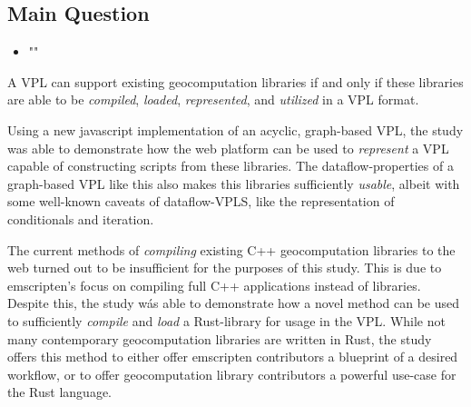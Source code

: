 \subsection*{Main Question}

\begin{itemize}[ ]
    \item "\myMainRQ"
\end{itemize}


A VPL can support existing geocomputation libraries if and only if these libraries are able to be \emph{compiled}, \emph{loaded}, \emph{represented}, and \emph{utilized} in a VPL format.

Using a new javascript implementation of an acyclic, graph-based VPL, the study was able to demonstrate how the web platform can be used to \emph{represent} a VPL capable of constructing scripts from these libraries.
The dataflow-properties of a graph-based VPL like this also makes this libraries sufficiently \emph{usable}, albeit with some well-known caveats of dataflow-VPLS, like the representation of conditionals and iteration. 

The current methods of \emph{compiling} existing C++ geocomputation libraries to the web turned out to be insufficient for the purposes of this study.  
This is due to emscripten's focus on compiling full C++ applications instead of libraries.
Despite this, the study wás able to demonstrate how a novel method can be used to sufficiently \emph{compile} and \emph{load} a Rust-library for usage in the VPL.
While not many contemporary geocomputation libraries are written in Rust, the study offers this method to either offer emscripten contributors a blueprint of a desired workflow, or to offer geocomputation library contributors a powerful use-case for the Rust language. 


